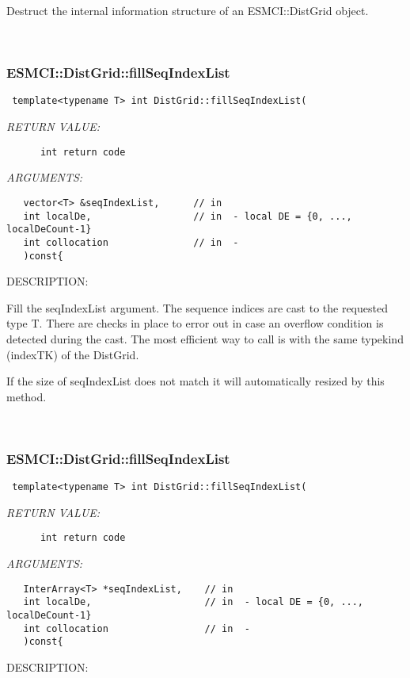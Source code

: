       Destruct the internal information structure of an ESMCI::DistGrid object.
   
 
\mbox{}\hrulefill\
 
\subsubsection [ESMCI::DistGrid::fillSeqIndexList] {ESMCI::DistGrid::fillSeqIndexList}


  
\begin{verbatim} template<typename T> int DistGrid::fillSeqIndexList(\end{verbatim}{\em RETURN VALUE:}
\begin{verbatim}      int return code\end{verbatim}{\em ARGUMENTS:}
\begin{verbatim}   vector<T> &seqIndexList,      // in
   int localDe,                  // in  - local DE = {0, ..., localDeCount-1}
   int collocation               // in  -
   )const{\end{verbatim}
{\sf DESCRIPTION:\\ }


      Fill the seqIndexList argument. The sequence indices are cast to the
      requested type T. There are checks in place to error out in case an
      overflow condition is detected during the cast. The most efficient way
      to call is with the same typekind (indexTK) of the DistGrid.
      
      If the size of seqIndexList does not match it will automatically
      resized by this method.
   
 
\mbox{}\hrulefill\
 
\subsubsection [ESMCI::DistGrid::fillSeqIndexList] {ESMCI::DistGrid::fillSeqIndexList}


  
\begin{verbatim} template<typename T> int DistGrid::fillSeqIndexList(\end{verbatim}{\em RETURN VALUE:}
\begin{verbatim}      int return code\end{verbatim}{\em ARGUMENTS:}
\begin{verbatim}   InterArray<T> *seqIndexList,    // in
   int localDe,                    // in  - local DE = {0, ..., localDeCount-1}
   int collocation                 // in  -
   )const{\end{verbatim}
{\sf DESCRIPTION:\\ }


